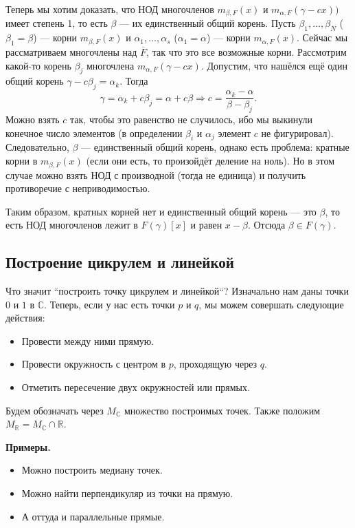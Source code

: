 Теперь мы хотим доказать, что НОД многочленов $m_{\beta, F}(x)$ и $m_{\alpha, F}(\gamma - cx))$ имеет степень 1, то есть $\beta$ --- их единственный общий корень.
Пусть $\beta_1, \dots, \beta_N$ ($\beta_1 = \beta$) --- корни $m_{\beta, F}(x)$ и $\alpha_1, \dots, \alpha_s$ ($\alpha_1 = \alpha$) --- корни $m_{\alpha, F}(x)$.
Сейчас мы рассматриваем многочлены над $\overline F$, так что это все возможные корни.
Рассмотрим какой-то корень $\beta_j$ многочлена $m_{\alpha, F}(\gamma - cx)$.
Допустим, что нашёлся ещё один общий корень $\gamma - c\beta_j = \alpha_k$.
Тогда
\[
    \gamma = \alpha_k + c\beta_j = \alpha + c\beta \Rightarrow c = \frac{\alpha_k - \alpha}{\beta - \beta_j}.
\]
Можно взять $c$ так, чтобы это равенство не случилось, ибо мы выкинули конечное число элементов (в определении $\beta_i$ и $\alpha_j$ элемент $c$ не фигурировал).
Следовательно, $\beta$ --- единственный общий корень, однако есть проблема: кратные корни в $m_{\beta, F}(x)$ (если они есть, то произойдёт деление на ноль).
Но в этом случае можно взять НОД с производной (тогда не единица) и получить противоречие с неприводимостью.

Таким образом, кратных корней нет и единственный общий корень --- это $\beta$, то есть НОД многочленов лежит в $F(\gamma)[x]$ и равен $x - \beta$.
Отсюда $\beta \in F(\gamma)$.

\QED

\subsection{Построение цикрулем и линейкой}
Что значит ``построить точку цикрулем и линейкой``?
Изначально нам даны точки $0$ и $1$ в $\mathbb C$.
Теперь, если у нас есть точки $p$ и $q$, мы можем совершать следующие действия:
\begin{itemize}
    \item Провести между ними прямую.
    \item Провести окружность с центром в $p$, проходящую через $q$.
    \item Отметить пересечение двух окружностей или прямых.
\end{itemize}

Будем обозначать через $M_\mathbb C$ множество построимых точек.
Также положим $M_\mathbb R = M_\mathbb C \cap \mathbb R$.

\textbf{Примеры.}
\begin{itemize}
    \item Можно построить медиану точек.
    \item Можно найти перпендикуляр из точки на прямую.
    \item А оттуда и параллельные прямые.
\end{itemize}

